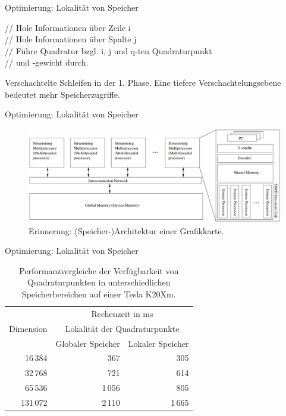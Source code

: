 \documentclass[10pt]{beamer}
\begin{document}
\begin{frame}{Optimierung: Lokalit\"at von Speicher}
  \begin{algorithm}[H]
    {
      {
        // Hole Informationen \"uber Zeile i \\
        {
          // Hole Informationen \"uber Spalte j \\

          {
            // F\"uhre Quadratur bzgl. i, j und q-ten Quadraturpunkt \\
            // und -gewicht durch.
          }
        }
      }      
    }
    \caption{Verschachtelte Schleifen in der 1. Phase. Eine tiefere
             Verschachtelungsebene bedeutet mehr Speicherzugriffe.}
  \end{algorithm}
\end{frame}

\begin{frame}{Optimierung: Lokalit\"at von Speicher}
  \begin{figure}
    \centering
    \includegraphics[width=\linewidth]{figures/fg-gpu_architecture.pdf}
    \caption{Erinnerung: (Speicher-)Architektur einer Grafikkarte.}
  \end{figure}
\end{frame}

\begin{frame}{Optimierung: Lokalität von Speicher}
  \small
  \begin{table}
    \begin{tabular}{rrr} \toprule
      \multirow{3}{*}{Dimension} & \multicolumn{2}{c}{Rechenzeit in ms} \\ \cmidrule{2-3}
      & \multicolumn{2}{c}{Lokalität der Quadraturpunkte} \\ \cmidrule{2-3}
      & Globaler Speicher & Lokaler Speicher \\ \cmidrule{1-3}
       16\,384 &    367 &    305  \\ %
       32\,768 &    721 &    614  \\
       65\,536 & 1\,056 &    805  \\
      131\,072 & 2\,110 & 1\,665 \\
      \bottomrule
    \end{tabular}
    \caption{Performanzvergleiche der Verfügbarkeit von Quadraturpunkten
             in unterschiedlichen Speicherbereichen auf einer Tesla K20Xm.}
  \end{table}
  \normalsize
\end{frame}
\end{document}
